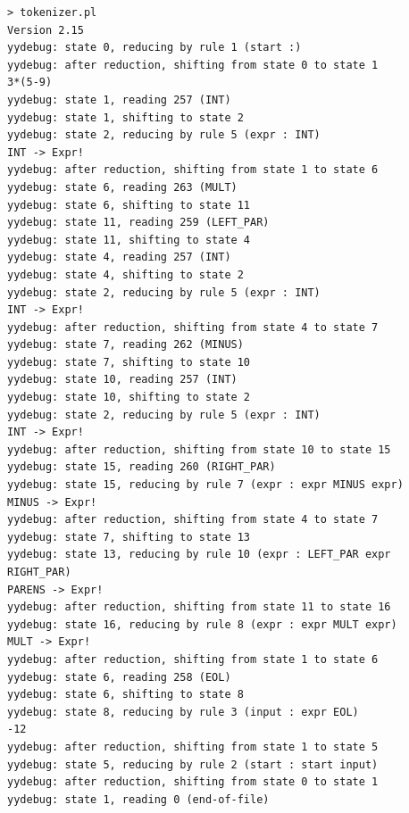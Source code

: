 \begin{verbatim}
> tokenizer.pl
Version 2.15
yydebug: state 0, reducing by rule 1 (start :)
yydebug: after reduction, shifting from state 0 to state 1
3*(5-9)
yydebug: state 1, reading 257 (INT)
yydebug: state 1, shifting to state 2
yydebug: state 2, reducing by rule 5 (expr : INT)
INT -> Expr!
yydebug: after reduction, shifting from state 1 to state 6
yydebug: state 6, reading 263 (MULT)
yydebug: state 6, shifting to state 11
yydebug: state 11, reading 259 (LEFT_PAR)
yydebug: state 11, shifting to state 4
yydebug: state 4, reading 257 (INT)
yydebug: state 4, shifting to state 2
yydebug: state 2, reducing by rule 5 (expr : INT)
INT -> Expr!
yydebug: after reduction, shifting from state 4 to state 7
yydebug: state 7, reading 262 (MINUS)
yydebug: state 7, shifting to state 10
yydebug: state 10, reading 257 (INT)
yydebug: state 10, shifting to state 2
yydebug: state 2, reducing by rule 5 (expr : INT)
INT -> Expr!
yydebug: after reduction, shifting from state 10 to state 15
yydebug: state 15, reading 260 (RIGHT_PAR)
yydebug: state 15, reducing by rule 7 (expr : expr MINUS expr)
MINUS -> Expr!
yydebug: after reduction, shifting from state 4 to state 7
yydebug: state 7, shifting to state 13
yydebug: state 13, reducing by rule 10 (expr : LEFT_PAR expr RIGHT_PAR)
PARENS -> Expr!
yydebug: after reduction, shifting from state 11 to state 16
yydebug: state 16, reducing by rule 8 (expr : expr MULT expr)
MULT -> Expr!
yydebug: after reduction, shifting from state 1 to state 6
yydebug: state 6, reading 258 (EOL)
yydebug: state 6, shifting to state 8
yydebug: state 8, reducing by rule 3 (input : expr EOL)
-12
yydebug: after reduction, shifting from state 1 to state 5
yydebug: state 5, reducing by rule 2 (start : start input)
yydebug: after reduction, shifting from state 0 to state 1
yydebug: state 1, reading 0 (end-of-file)

\end{verbatim}

